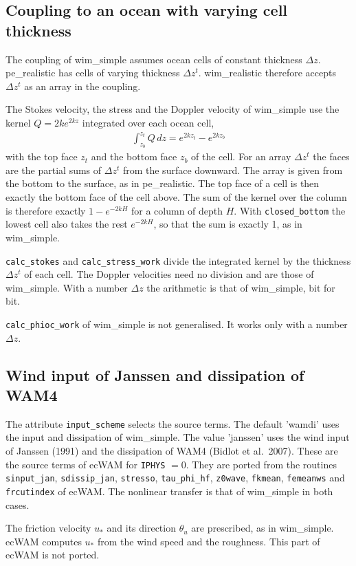 \documentclass[12pt]{article}
\newcommand{\beeq}  { \begin{eqnarray*} }
\newcommand{\eeeq}  { \end{eqnarray*}}
\begin{document}
\subsection*{Coupling to an ocean with varying cell thickness}

The coupling of wim\_simple assumes ocean cells of constant thickness $\Delta z$.
pe\_realistic has cells of varying thickness $\Delta z^t$.
wim\_realistic therefore accepts $\Delta z^t$ as an array in the coupling.

The Stokes velocity, the stress and the Doppler velocity of wim\_simple use the kernel $Q = 2 k e^{2 k z}$ integrated over each ocean cell,
\beeq
 \int_{z_b}^{z_t} Q\, dz = e^{2 k z_t} - e^{2 k z_b}
\eeeq
with the top face $z_t$ and the bottom face $z_b$ of the cell.
For an array $\Delta z^t$ the faces are the partial sums of $\Delta z^t$ from the surface downward.
The array is given from the bottom to the surface, as in pe\_realistic.
The top face of a cell is then exactly the bottom face of the cell above.
The sum of the kernel over the column is therefore exactly $1 - e^{-2 k H}$ for a column of depth $H$.
With \verb|closed_bottom| the lowest cell also takes the rest $e^{-2 k H}$, so that the sum is exactly 1, as in wim\_simple.

\verb|calc_stokes| and \verb|calc_stress_work| divide the integrated kernel by the thickness $\Delta z^t$ of each cell.
The Doppler velocities need no division and are those of wim\_simple.
With a number $\Delta z$ the arithmetic is that of wim\_simple, bit for bit.

\verb|calc_phioc_work| of wim\_simple is not generalised.
It works only with a number $\Delta z$.

\subsection*{Wind input of Janssen and dissipation of WAM4}

The attribute \verb|input_scheme| selects the source terms.
The default 'wamdi' uses the input and dissipation of wim\_simple.
The value 'janssen' uses the wind input of Janssen (1991) and the dissipation of WAM4 (Bidlot et al.\ 2007).
These are the source terms of ecWAM for \verb|IPHYS| $=0$.
They are ported from the routines \verb|sinput_jan|, \verb|sdissip_jan|, \verb|stresso|, \verb|tau_phi_hf|, \verb|z0wave|, \verb|fkmean|, \verb|femeanws| and \verb|frcutindex| of ecWAM.
The nonlinear transfer is that of wim\_simple in both cases.

The friction velocity $u_*$ and its direction $\theta_u$ are prescribed, as in wim\_simple.
ecWAM computes $u_*$ from the wind speed and the roughness.
This part of ecWAM is not ported.
\end{document}
